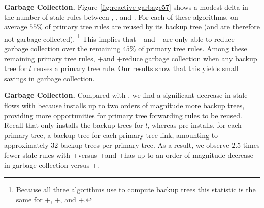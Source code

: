 {\bf \post Garbage Collection.}
Figure \ref{fig:reactive-garbage57} shows a modest delta in the number of stale rules between \bases, \merges, and \lbs. For each of these algorithms, on average $55\%$ of primary
tree rules are reused by its backup tree (and are therefore not garbage collected).
\footnote{Because all three algorithms use \steiner to compute backup trees this statistic is the same for \posts+\bases, \posts+\merges, and \posts+\lbs.}
This implies that \posts+\merge and \posts+\lb are only able to reduce garbage collection over the remaining  $45\%$ of primary tree rules. 
Among these remaining primary tree rules, \posts+\merge and \posts+\lb reduce garbage collection when any backup tree for $l$ reuses a primary tree rule.  Our results
show that this yields small savings in garbage collection.



{\bf \pre Garbage Collection.}
Compared with \posts, we find a significant decrease in stale flows with \pre because \pre installs up to two orders of magnitude more backup trees, providing
more opportunities for primary tree forwarding rules to be reused.  Recall that \post only installs the backup trees for $l$, whereas \pre pre-installs, for each primary tree, a backup tree for
each primary tree link, amounting to approximately $32$ backup trees per primary tree.  As a result, we observe $2.5$ times fewer stale rules with \pres+\base versus \posts+\base and 
\pres+\merge has up to an order of magnitude decrease in garbage collection versus \posts+\merges.

